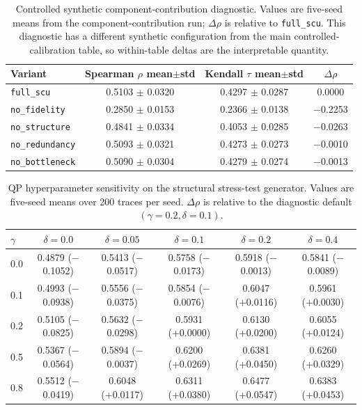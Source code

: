 \documentclass[pdflatex,sn-mathphys-num]{sn-jnl}
\begin{document}
\begin{table}[ht]
\caption{Controlled synthetic component-contribution diagnostic. Values are five-seed means from the component-contribution run; $\Delta\rho$ is relative to \texttt{full\_scu}. This diagnostic has a different synthetic configuration from the main controlled-calibration table, so within-table deltas are the interpretable quantity.}
\label{tab:supp-ablation}
\centering
\small
\begin{tabular}{lccc}
\toprule
\textbf{Variant} & \textbf{Spearman $\rho$ mean$\pm$std} & \textbf{Kendall $\tau$ mean$\pm$std} & \textbf{$\Delta\rho$} \\
\midrule
\texttt{full\_scu} & 0.5103 $\pm$ 0.0320 & 0.4297 $\pm$ 0.0287 & 0.0000 \\
\texttt{no\_fidelity} & 0.2850 $\pm$ 0.0153 & 0.2366 $\pm$ 0.0138 & $-$0.2253 \\
\texttt{no\_structure} & 0.4841 $\pm$ 0.0334 & 0.4053 $\pm$ 0.0285 & $-$0.0263 \\
\texttt{no\_redundancy} & 0.5093 $\pm$ 0.0321 & 0.4273 $\pm$ 0.0273 & $-$0.0010 \\
\texttt{no\_bottleneck} & 0.5090 $\pm$ 0.0304 & 0.4279 $\pm$ 0.0274 & $-$0.0013 \\
\bottomrule
\end{tabular}
\end{table}

\begin{table}[ht]
\caption{QP hyperparameter sensitivity on the structural stress-test generator. Values are five-seed means over 200 traces per seed. $\Delta\rho$ is relative to the diagnostic default $(\gamma=0.2,\delta=0.1)$.}
\label{tab:supp-gamma-delta-sensitivity}
\centering
\small
\begin{tabular}{lccccc}
\toprule
\textbf{$\gamma$} & \textbf{$\delta=0.0$} & \textbf{$\delta=0.05$} & \textbf{$\delta=0.1$} & \textbf{$\delta=0.2$} & \textbf{$\delta=0.4$} \\
\midrule
0.0 & 0.4879 ($-$0.1052) & 0.5413 ($-$0.0517) & 0.5758 ($-$0.0173) & 0.5918 ($-$0.0013) & 0.5841 ($-$0.0089) \\
0.1 & 0.4993 ($-$0.0938) & 0.5556 ($-$0.0375) & 0.5854 ($-$0.0076) & 0.6047 (+0.0116) & 0.5961 (+0.0030) \\
0.2 & 0.5105 ($-$0.0825) & 0.5632 ($-$0.0298) & 0.5931 (+0.0000) & 0.6130 (+0.0200) & 0.6055 (+0.0124) \\
0.5 & 0.5367 ($-$0.0564) & 0.5894 ($-$0.0037) & 0.6200 (+0.0269) & 0.6381 (+0.0450) & 0.6260 (+0.0329) \\
0.8 & 0.5512 ($-$0.0419) & 0.6048 (+0.0117) & 0.6311 (+0.0380) & 0.6477 (+0.0547) & 0.6383 (+0.0453) \\
\bottomrule
\end{tabular}
\end{table}
\end{document}
